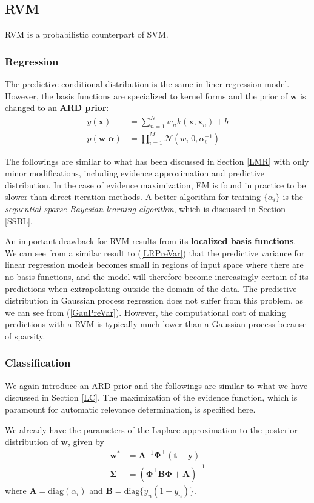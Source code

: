 \documentclass[a4paper]{report}
\newcommand{\up}{\mathrm}
\renewcommand{\bf}{\mathbf}
\renewcommand{\cal}{\mathcal}
\newcommand{\imp}[1]{{\color{blue}\textit{#1}}}
\newcommand{\bs}{\boldsymbol}
\begin{document}
\subsection{RVM}
RVM is a probabilistic counterpart of SVM. 
\subsubsection{Regression}
The predictive conditional distribution is the same in liner regression model. However, the basis functions are specialized to kernel forms and the prior of $\bf{w}$ is changed to an \textbf{ARD prior}:
\begin{align}
	y(\bf{x}) &= \sum_{n=1}^{N} w_n k(\bf{x},\bf{x}_n) + b\\
	p(\bf{w}|\bs{\alpha}) &= \prod_{i=1}^M \cal{N}(w_i |0,\alpha_i^{-1})
\end{align}

The followings are similar to what has been discussed in Section \ref{LMR} with only minor modifications, including evidence approximation and predictive distribution. In the case of evidence maximization, EM is found in practice to be slower than direct iteration methods. A better algorithm for training $\{ \alpha_i\}$ is the \imp{sequential sparse Bayesian learning algorithm}, which is discussed in Section \ref{SSBL}. 

An important drawback for RVM results from its \textbf{localized basis functions}. We can see from a similar result to (\ref{LRPreVar}) that the predictive variance for linear regression models becomes small in regions of input space where there are no basis functions, and the model will therefore become increasingly certain of its predictions when extrapolating outside the domain of the data. The predictive distribution in Gaussian process regression does not suffer from this problem, as we can see from (\ref{GauPreVar}). However, the computational cost of making predictions with a RVM is typically much lower than a Gaussian process because of sparsity.
\subsubsection{Classification}
We again introduce an ARD prior and the followings are similar to what we have discussed in Section \ref{LC}. The maximization of the evidence function, which is paramount for automatic relevance determination, is specified here.

We already have the parameters of the Laplace approximation to the posterior distribution of $\bf{w}$, given by
\begin{align}
	\bf{w}^* &= \bf{A}^{-1} \bs{\Phi}^{\intercal} (\bf{t-y}) \\
	\bs{\Sigma} &= (\bs{\Phi}^{\intercal} \bf{B} \bs{\Phi} + \bf{A})^{-1}
\end{align}
where $\bf{A} = \up{diag}(\alpha_i)$ and $\bf{B} = \up{diag}\{y_n(1-y_n)\}$. 
\end{document}
